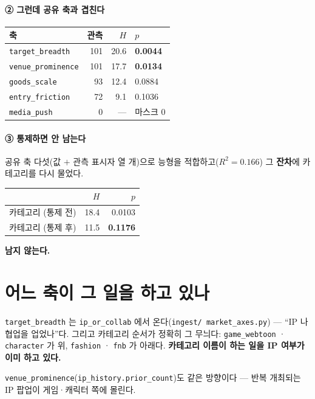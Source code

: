 \documentclass[10pt]{article}
\begin{document}
\paragraph{② 그런데 공유 축과 겹친다}

\begin{center}\footnotesize
\begin{tabular}{lrrl}
\hline
축 & 관측 & $H$ & $p$ \\
\hline
\texttt{target\_breadth} & 101 & 20.6 & \textbf{0.0044} \\
\texttt{venue\_prominence} & 101 & 17.7 & \textbf{0.0134} \\
\texttt{goods\_scale} & 93 & 12.4 & 0.0884 \\
\texttt{entry\_friction} & 72 & 9.1 & 0.1036 \\
\texttt{media\_push} & 0 & --- & 마스크 0 \\
\hline
\end{tabular}
\end{center}

\paragraph{③ 통제하면 안 남는다} 공유 축 다섯(값 $+$ 관측 표시자 열 개)으로
능형을 적합하고($R^2{=}0.166$) 그 \textbf{잔차}에 카테고리를 다시 물었다.

\begin{center}\small
\begin{tabular}{lrr}
\hline
& $H$ & $p$ \\
\hline
카테고리 (통제 전) & 18.4 & 0.0103 \\
카테고리 (통제 후) & 11.5 & \textbf{0.1176} \\
\hline
\end{tabular}
\end{center}

\textbf{남지 않는다.}

\section{어느 축이 그 일을 하고 있나}

\texttt{target\_breadth} 는 \texttt{ip\_or\_collab} 에서 온다(\texttt{ingest/
market\_axes.py}) --- ``IP 나 협업을 업었나''다. 그리고 카테고리 순서가 정확히
그 무늬다: \texttt{game\_webtoon} · \texttt{character} 가 위, \texttt{fashion} ·
\texttt{fnb} 가 아래다. \textbf{카테고리 이름이 하는 일을 IP 여부가 이미 하고
있다.}

\texttt{venue\_prominence}(\texttt{ip\_history.prior\_count})도 같은 방향이다 ---
반복 개최되는 IP 팝업이 게임·캐릭터 쪽에 몰린다.
\end{document}
